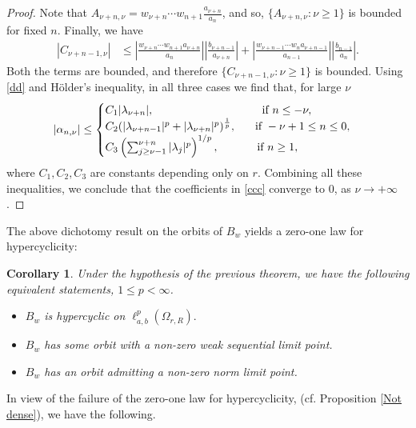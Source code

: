\documentclass[12pt, reqno]{amsart}
\newtheorem{corollary}[theorem]{Corollary}
\theoremstyle{definition}
\theoremstyle{remark}
\numberwithin{equation}{section}
\begin{document}
\begin{proof}
 Note that $A_{\nu+n,\nu}=w_{\nu+n}\cdots w_{n+1}\frac{a_{\nu+n}}{a_{n}}$,
and so, $\{A_{\nu+n,\nu}:\nu\geq 1\}$ is bounded for fixed $n$. Finally, we have
\[
\begin{aligned}
|C_{\nu+n-1,\nu}|
&\le
\left|\frac{w_{\nu+n}\cdots w_{n+1}a_{\nu+n}}{a_{n}}\right|
   \left|\frac{b_{\nu+n-1}}{a_{\nu+n}}\right|+
\left|\frac{w_{\nu+n-1}\cdots w_{n}a_{\nu+n-1}}{a_{n-1}}\right|
   \left|\frac{b_{n-1}}{a_{n}}\right|.
\end{aligned}
\]
Both the terms are bounded, and therefore  
$
\{C_{\nu+n-1,\nu}:\nu\geq 1\}
$
is bounded. Using \eqref{dd} and H\"{o}lder's inequality, in all three cases we find that, for large $\nu$
$$
|\alpha_{n,\nu}|\leq\begin{cases}
   C_{1}|\lambda_{\nu+n}|,\hspace{3.4cm} \text{if } n\leq -\nu,\\ 
   C_{2}(|\lambda_{\nu+n-1}|^{  p}+|\lambda_{\nu+n}|^{p})^{\frac{1}{p}},\hspace{.6cm} \text{if }-\nu+1\leq n\leq 0,\\ 
    C_{3} \left(\sum_{j\geq \nu-1}^{\nu+n}|\lambda_j|^p\right)^{1/p}, \hspace{1.2cm} \text{if }n\geq 1,\\ 
    \end{cases}
    $$
where $C_{1},C_{2},C_{3}$ are constants depending only on $r$. Combining all these inequalities, we conclude that the coefficients in \eqref{ccc} converge to $0$, as $\nu\rightarrow +\infty$.
\end{proof} 

The above dichotomy result on the orbits of $B_w$ yields a zero-one law for hypercyclicity:

\begin{corollary}
Under the hypothesis of the previous theorem, we have the following equivalent statements, $1\leq p<\infty$. 
\begin{itemize}
\item[(i)] $B_w$ is hypercyclic on $\ell^p_{a,b}(\Omega_{r,R}).$
\item[(ii)] $B_w$ has some orbit with a non-zero weak sequential limit point.
\item[(iii)] $B_w$ has an orbit admitting a non-zero norm limit point.
\end{itemize}
\end{corollary}


In view of the failure of the zero-one law for hypercyclicity, (cf. Proposition \ref{Not dense}), we have the following.
\end{document}
